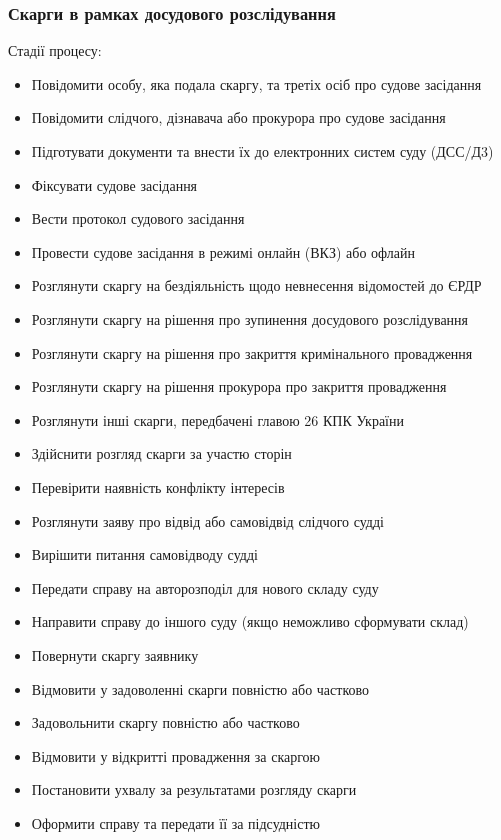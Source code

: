 \documentclass{article}
\begin{document}
\newpage
\subsubsection{Скарги в рамках досудового розслідування}

Стадії процесу:

\begin{itemize}
    \item Повідомити особу, яка подала скаргу, та третіх осіб про судове засідання
    \item Повідомити слідчого, дізнавача або прокурора про судове засідання
    \item Підготувати документи та внести їх до електронних систем суду (ДСС/Д3)
    \item Фіксувати судове засідання
    \item Вести протокол судового засідання
    \item Провести судове засідання в режимі онлайн (ВКЗ) або офлайн
    \item Розглянути скаргу на бездіяльність щодо невнесення відомостей до ЄРДР
    \item Розглянути скаргу на рішення про зупинення досудового розслідування
    \item Розглянути скаргу на рішення про закриття кримінального провадження
    \item Розглянути скаргу на рішення прокурора про закриття провадження
    \item Розглянути інші скарги, передбачені главою 26 КПК України
    \item Здійснити розгляд скарги за участю сторін
    \item Перевірити наявність конфлікту інтересів
    \item Розглянути заяву про відвід або самовідвід слідчого судді
    \item Вирішити питання самовідводу судді
    \item Передати справу на авторозподіл для нового складу суду
    \item Направити справу до іншого суду (якщо неможливо сформувати склад)
    \item Повернути скаргу заявнику
    \item Відмовити у задоволенні скарги повністю або частково
    \item Задовольнити скаргу повністю або частково
    \item Відмовити у відкритті провадження за скаргою
    \item Постановити ухвалу за результатами розгляду скарги
    \item Оформити справу та передати її за підсудністю
\end{itemize}
\end{document}
